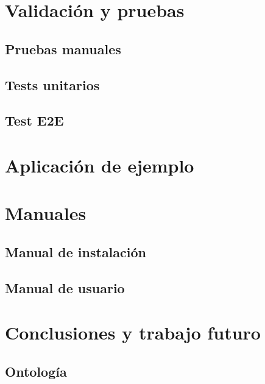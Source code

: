 \documentclass[12pt]{report} %
\begin{document}
\chapter{Validación y pruebas}

\section{Pruebas manuales}

\section{Tests unitarios}

\section{Test E2E}

\chapter{Aplicación de ejemplo}

\chapter{Manuales}

\section{Manual de instalación}

\section{Manual de usuario}

\chapter{Conclusiones y trabajo futuro}

\begin{appendices}
\chapter{Ontología}

\end{appendices}



\end{document}
